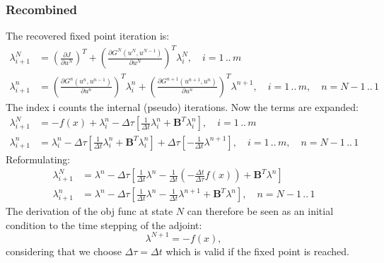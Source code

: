 \documentclass[10pt]{article}
\begin{document}
\subsubsection*{Recombined}
The recovered fixed point iteration is:
\begin{align}
\lambda^{N}_{i+1} &= \left( \frac{\partial J}{\partial u^N} \right)^T + \left( \frac{\partial G^N\left( u^N,u^{N-1} \right)}{\partial u^N}  \right)^T \lambda^N_i ,\quad i = 1\,..\,m \\
\lambda^{n}_{i+1} &=  \left( \frac{\partial G^n\left( u^n,u^{n-1} \right)}{\partial u^n}  \right)^T \lambda^n_i  +\left( \frac{\partial G^{n+1}\left( u^{n+1},u^{n} \right)}{\partial u^n}  \right)^T \lambda^{n+1} ,\quad i = 1\,..\,m,\quad n = N-1\,..\, 1
\end{align}
The index i counts the internal (pseudo) iterations. Now the terms are expanded:
\begin{align}
\lambda^{N}_{i+1} &= -f(x) + \lambda^n_i - \Delta\tau\left[ \frac{1}{\Delta t} \lambda^n_i + \mathbf{B}^T \lambda^n_i \right] ,\quad i = 1\,..\,m \\
\lambda^{n}_{i+1} &= \lambda^n_i - \Delta\tau\left[ \frac{1}{\Delta t} \lambda^n_i + \mathbf{B}^T \lambda^n_i \right] + \Delta\tau\left[ -\frac{1}{\Delta t} \lambda^{n+1} \right]  ,\quad i = 1\,..\,m ,\quad n = N-1\,..\, 1
\end{align}
Reformulating:
\begin{align}
\lambda^{N}_{i+1} &= \lambda^n - \Delta\tau\left[ \frac{1}{\Delta t} \lambda^n - \frac{1}{\Delta t} \left( - \frac{\Delta t}{\Delta\tau} f(x) \right) + \mathbf{B}^T \lambda^n \right]  \\
\lambda^{n}_{i+1} &= \lambda^n - \Delta\tau\left[ \frac{1}{\Delta t} \lambda^n - \frac{1}{\Delta t} \lambda^{n+1} + \mathbf{B}^T \lambda^n \right]  ,\quad n = N-1\,..\, 1
\end{align}
The derivation of the obj func at state $N$ can therefore be seen as an initial condition to the time stepping of the adjoint:
\begin{equation}
\lambda^{N+1} = -f(x),
\end{equation}
considering that we choose $\Delta\tau=\Delta t$ which is valid if the fixed point is reached.
\end{document}
